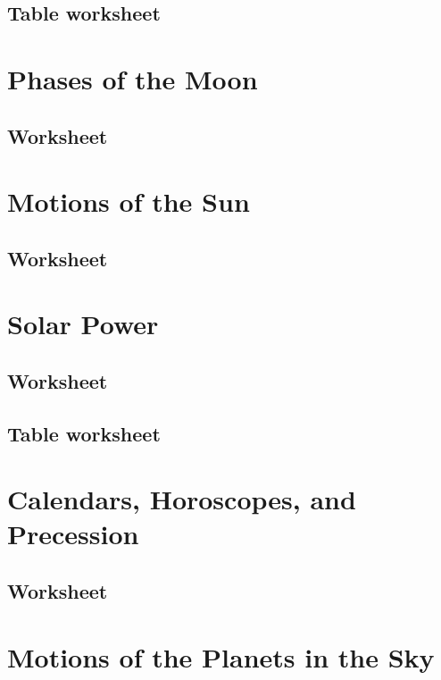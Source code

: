 \documentclass[12pt]{article}
\begin{document}
\newpage
\subsection{Table worksheet}\label{apx:lab_03_tb}


\newpage
\section{Phases of the Moon}\label{apx:lab_04}
\subsection{Worksheet}\label{apx:lab_04_ws}


\newpage
\section{Motions of the Sun}\label{apx:lab_05}
\subsection{Worksheet}\label{apx:lab_05_ws}


\newpage
\section{Solar Power}\label{apx:lab_06}
\subsection{Worksheet}\label{apx:lab_06_ws}


\newpage
\subsection{Table worksheet}\label{apx:lab_06_tb}


\newpage
\section{Calendars, Horoscopes, and Precession}\label{apx:lab_07}
\subsection{Worksheet}\label{apx:lab_07_ws}


\newpage
\section{Motions of the Planets in the Sky}\label{apx:lab_08}
\end{document}
